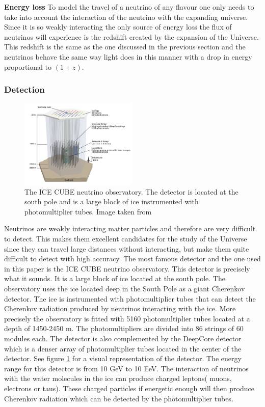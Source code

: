 \documentclass{article}
\begin{document}
\textbf{Energy loss}
To model the travel of a neutrino of any flavour one only needs to take into account the interaction of the neutrino with the expanding universe. Since it is so weakly interacting the only 
source of energy loss the flux of neutrinos will experience is the redshift created by the expansion of the Universe. This redshift is the same as the one discussed in the previous section and the neutrinos 
behave the same way light does in this manner with a drop in energy proportional to $(1+z)$.



 

\subsubsection{Detection}
\begin{figure}
    \centering
    \includegraphics[width = 0.5\textwidth]{Ice_cube_layot.png}
    \caption{The ICE CUBE neutrino observatory. The detector is located at the south pole and is a large block of ice instrumented with photomultiplier tubes. Image taken from \cite{Andeen_2019}}
    \label{fig:Ice_cube}
\end{figure}

Neutrinos are weakly interacting matter particles and therefore are very difficult to detect. This makes them excellent candidates for the study of the Universe since they can travel large distances without interacting, but make them 
quite difficult to detect with high accuracy. The most famous detector and the one used in this paper is the ICE CUBE neutrino observatory. This detector is precisely what it sounds. It is a large block of ice located at the south pole.
The observatory uses the ice located deep in the South Pole as a giant Cherenkov detector. The ice is instrumented with photomultiplier tubes that can detect the Cherenkov radiation produced by neutrinos interacting with the ice. 
More precisely the observatory is fitted with 5160 photomultiplier tubes located at a depth of 1450-2450 m. The photomultipliers are divided into 86 strings of 60 modules each. The detector is also complemented by the DeepCore detector which is a denser array of photomultiplier tubes located in the center of the detector. See figure \ref{fig:Ice_cube} for a visual representation of the detector.
The energy range for this detector is from 10 GeV to 10 EeV. The interaction of neutrinos with the water molecules in the ice can produce charged leptons( muons, electrons or taus). These charged particles if energetic enough will then produce Cherenkov radiation which can be detected by the photomultiplier tubes.
\end{document}
